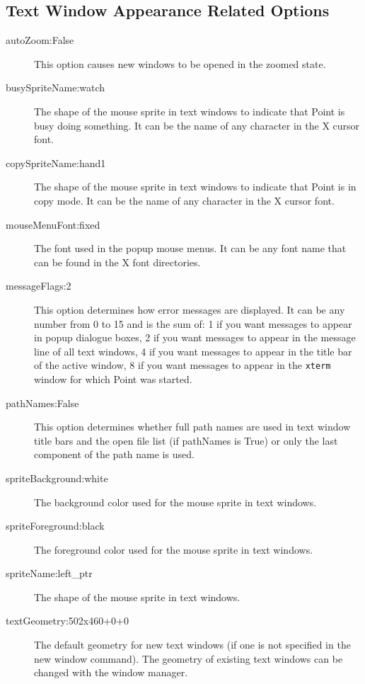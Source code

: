 \subsection{Text Window Appearance Related Options}

\begin{description}

\item[autoZoom:False]
This option causes new windows to be opened in the zoomed state.

\item[busySpriteName:watch]
The shape of the mouse sprite in text windows to indicate
that Point is busy doing something.
It can be the name of any character in the X cursor font.

\item[copySpriteName:hand1]
The shape of the mouse sprite in text windows to indicate
that Point is in copy mode.
It can be the name of any character in the X cursor font.

\item[mouseMenuFont:fixed]
The font used in the popup mouse menus.
It can be any font name that can be found in the X font directories.

\item[messageFlags:2]
This option determines how error messages are displayed.
It can be any number from 0 to 15 and is the sum of:
1 if you want messages to appear in popup dialogue boxes,
2 if you want messages to appear in the message line of all text windows,
4 if you want messages to appear in the title bar of the active window,
8 if you want messages to appear in the {\tt xterm} window for which Point
was started.

\item[pathNames:False]
This option determines whether full path names are used in text window
title bars and the open file list (if pathNames is True)
or only the last component of the path name is used.

\item[spriteBackground:white]
The background color used for the mouse sprite in text windows.

\item[spriteForeground:black]
The foreground color used for the mouse sprite in text windows.

\item[spriteName:left\_ptr]
The shape of the mouse sprite in text windows.

\item[textGeometry:502x460+0+0]
The default geometry for new text windows
(if one is not specified in the new window command).
The geometry of existing text windows can be changed with the
window manager.


\end{description}

